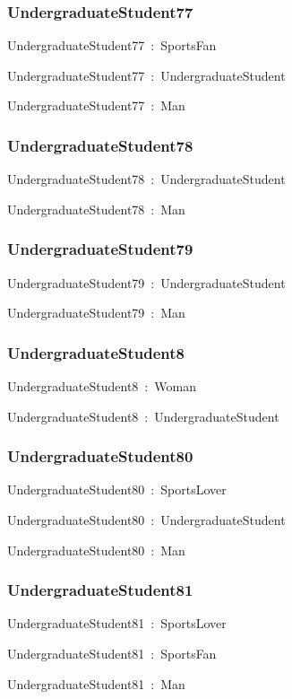 \documentclass{article}
\begin{document}
\subsubsection*{UndergraduateStudent77}

UndergraduateStudent77~:~SportsFan

UndergraduateStudent77~:~UndergraduateStudent

UndergraduateStudent77~:~Man

\subsubsection*{UndergraduateStudent78}

UndergraduateStudent78~:~UndergraduateStudent

UndergraduateStudent78~:~Man

\subsubsection*{UndergraduateStudent79}

UndergraduateStudent79~:~UndergraduateStudent

UndergraduateStudent79~:~Man

\subsubsection*{UndergraduateStudent8}

UndergraduateStudent8~:~Woman

UndergraduateStudent8~:~UndergraduateStudent

\subsubsection*{UndergraduateStudent80}

UndergraduateStudent80~:~SportsLover

UndergraduateStudent80~:~UndergraduateStudent

UndergraduateStudent80~:~Man

\subsubsection*{UndergraduateStudent81}

UndergraduateStudent81~:~SportsLover

UndergraduateStudent81~:~SportsFan

UndergraduateStudent81~:~Man
\end{document}
